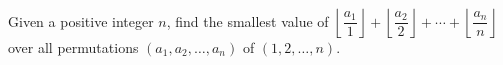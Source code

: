 Given a positive integer $n$, find the smallest value of $\left\lfloor \dfrac{a_1}{1} \right\rfloor + \left\lfloor \dfrac{a_2}{2} \right\rfloor + \cdots + \left\lfloor \dfrac{a_n}{n} \right\rfloor$ over all permutations $(a_1,a_2,\ldots,a_n)$ of $(1,2,\ldots,n)$.
